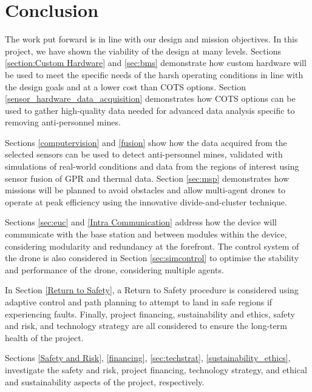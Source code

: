 \newpage
{}

\section{Conclusion} \label{conclusion}

The work put forward is in line with our design and mission objectives. In this project, we have shown the viability of the design at many levels. Sections \ref{section:Custom Hardware} and \ref{sec:bms} demonstrate how custom hardware will be used to meet the specific needs of the harsh operating conditions in line with the design goals and at a lower cost than \gls{COTS} options. Section \ref{sensor_hardware_data_acquisition} demonstrates how \gls{COTS} options can be used to gather high-quality data needed for advanced data analysis specific to removing anti-personnel mines.

Sections \ref{computervision} and \ref{fusion} show how the data acquired from the selected sensors can be used to detect anti-personnel mines, validated with simulations of real-world conditions and data from the regions of interest using sensor fusion of \gls{GPR} and thermal data. Section \ref{sec:msp} demonstrates how missions will be planned to avoid obstacles and allow multi-agent drones to operate at peak efficiency using the innovative divide-and-cluster technique. 

Sections \ref{sec:euc} and \ref{Intra Communication} address how the device will communicate with the base station and between modules within the device, considering modularity and redundancy at the forefront. The control system of the drone is also considered in Section \ref{sec:simcontrol} to optimise the stability and performance of the drone, considering multiple agents. 

In Section \ref{Return to Safety}, a Return to Safety procedure is considered using adaptive control and path planning to attempt to land in safe regions if experiencing faults. Finally, project financing, sustainability and ethics, safety and risk, and technology strategy are all considered to ensure the long-term health of the project. 

Sections \ref{Safety and Risk}, \ref{financing}, \ref{sec:techstrat}, \ref{sustainability_ethics}, investigate the safety and risk, project financing, technology strategy, and ethical and sustainability aspects of the project, respectively.


